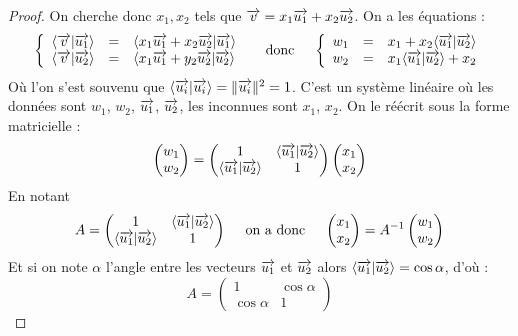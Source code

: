 \documentclass[class=report,crop=false]{standalone}
\begin{document}
\begin{proof}
On cherche donc $x_1, x_2$ tels que $\overrightarrow v  = x_1 \overrightarrow{u_1} + x_2 \overrightarrow{u_2}$.
On a les équations :
$$
\left\{
\begin{array}{rcl}
\langle \overrightarrow v | \overrightarrow{u_1} \rangle &=& \langle x_1 \overrightarrow{u_1} + x_2 \overrightarrow{u_2} | \overrightarrow{u_1} \rangle  \\
\langle \overrightarrow v | \overrightarrow{u_2} \rangle &=& \langle x_1 \overrightarrow{u_1} + y_2 \overrightarrow{u_2} | \overrightarrow{u_2} \rangle  \\
\end{array}
\right.
\quad\text{ donc }\quad
\left\{
\begin{array}{rcl}
w_1 &=&  x_1+ x_2 \langle \overrightarrow{u_1} | \overrightarrow{u_2} \rangle  \\
w_2 &=& x_1 \langle \overrightarrow{u_1} | \overrightarrow{u_2} \rangle+ x_2  \\
\end{array}
\right.
$$
Où l'on s'est souvenu que $\langle \overrightarrow{u_i} | \overrightarrow{u_i} \rangle = \| \overrightarrow{u_i} \|^2 = 1$.
C'est un système linéaire où les données sont $w_1$, $w_2$, $\overrightarrow{u_1}$, $\overrightarrow{u_2}$, 
les inconnues sont $x_1$, $x_2$. On le réécrit sous la forme matricielle :
$$\begin{pmatrix}w_1\\w_2\end{pmatrix}
= \begin{pmatrix}1&\langle \overrightarrow{u_1} | \overrightarrow{u_2} \rangle\\ \langle \overrightarrow{u_1} | \overrightarrow{u_2} \rangle&1\end{pmatrix}
\begin{pmatrix}x_1\\x_2\end{pmatrix}$$
En notant 
$$A = \begin{pmatrix}1&\langle \overrightarrow{u_1} | \overrightarrow{u_2} \rangle\\ 
\langle \overrightarrow{u_1} | \overrightarrow{u_2} \rangle&1\end{pmatrix}
\quad \text{ on a donc } \quad 
\begin{pmatrix}x_1\\x_2\end{pmatrix} =  A^{-1} \begin{pmatrix}w_1\\w_2\end{pmatrix}$$
Et si on note $\alpha$ l'angle entre les vecteurs  $\overrightarrow{u_1}$ et $\overrightarrow{u_2}$ alors
$\langle \overrightarrow{u_1} | \overrightarrow{u_2} \rangle = \cos \alpha$, d'où :
$$A = \begin{pmatrix}1&\cos \alpha \\ \cos \alpha & 1\end{pmatrix}
$$
\end{proof}
\end{document}
